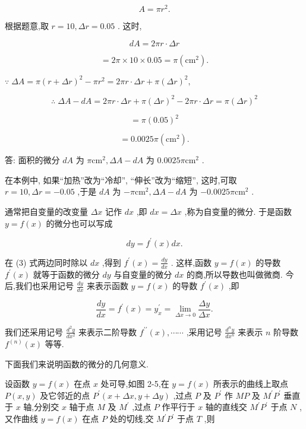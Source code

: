\documentclass[lang=cn,newtx,10pt,scheme=chinese]{elegantbook}
\begin{document}
\[
A = \pi {r}^{2}.
\]

根据题意,取 \(r = {10},{\Delta r} = {0.05}\) . 这时,

\[
{dA} = {2\pi r} \cdot {\Delta r}
\]

\[
= {2\pi } \times {10} \times {0.05} = \pi \left( {\mathrm{{cm}}}^{2}\right) \text{.}
\]

\(\because \;{\Delta A} = \pi {\left( r + \Delta r\right) }^{2} - \pi {r}^{2} = {2\pi r} \cdot {\Delta r} + \pi {\left( \Delta r\right) }^{2},\)

\[
\therefore \;{\Delta A} - {dA} = {2\pi r} \cdot {\Delta r} + \pi {\left( \Delta r\right) }^{2} - {2\pi r} \cdot {\Delta r} = \pi {\left( \Delta r\right) }^{2}
\]

\[
= \pi {\left( {0.05}\right) }^{2}
\]

\[
= {0.0025\pi }\left( {\mathrm{{cm}}}^{2}\right) \text{.}
\]

答: 面积的微分 \({dA}\) 为 \(\pi {\mathrm{{cm}}}^{2},{\Delta A} - {dA}\) 为 \({0.0025\pi }{\mathrm{{cm}}}^{2}\) .

在本例中, 如果“加热”改为“冷却”, “伸长”改为“缩短”, 这时,可取 \(r = {10},{\Delta r} = - {0.05}\) ,于是 \({dA}\) 为 \(- \pi {\mathrm{{cm}}}^{2},{\Delta A} - {dA}\) 为 \(- {0.0025\pi }{\mathrm{{cm}}}^{2}\) .

通常把自变量的改变量 \({\Delta x}\) 记作 \({dx}\) ,即 \({dx} = {\Delta x}\) ,称为自变量的微分. 于是函数 \(y = f\left( x\right)\) 的微分也可以写成

\[
{dy} = {f}^{\prime }\left( x\right) {dx}. \tag{3}
\]

在 (3) 式两边同时除以 \({dx}\) ,得到 \({f}^{\prime }\left( x\right) = \frac{dy}{dx}\) . 这样,函数 \(y = f\left( x\right)\) 的导数 \({f}^{\prime }\left( x\right)\) 就等于函数的微分 \({dy}\) 与自变量的微分 \({dx}\) 的商,所以导数也叫做微商. 今后,我们也采用记号 \(\frac{dy}{dx}\) 来表示函数 \(y = f\left( x\right)\) 的导数 \({f}^{\prime }\left( x\right)\) ,即

\[
\frac{dy}{dx} = {f}^{\prime }\left( x\right) = {y}_{x}^{\prime } = \mathop{\lim }\limits_{{{\Delta x} \rightarrow 0}}\frac{\Delta y}{\Delta x}.
\]

我们还采用记号 \(\frac{{d}^{2}y}{d{x}^{2}}\) 来表示二阶导数 \({f}^{\prime \prime }\left( x\right) ,\cdots \cdots\) ,采用记号 \(\frac{{d}^{n}y}{d{x}^{n}}\) 来表示 \(n\) 阶导数 \({f}^{\left( n\right) }\left( x\right)\) 等等.

下面我们来说明函数的微分的几何意义.

设函数 \(y = f\left( x\right)\) 在点 \(x\) 处可导,如图 2-5,在 \(y = f\left( x\right)\) 所表示的曲线上取点 \(P\left( {x,y}\right)\) 及它邻近的点 \({P}^{\prime }\left( {x + {\Delta x},y + {\Delta y}}\right)\) ,过点 \(P\) 及 \({P}^{\prime }\) 作 \({MP}\) 及 \({M}^{\prime }{P}^{\prime }\) 垂直于 \(x\) 轴,分别交 \(x\) 轴于点 \(M\) 及 \({M}^{\prime }\) ,过点 \(P\) 作平行于 \(x\) 轴的直线交 \({M}^{\prime }{P}^{\prime }\) 于点 \(N\) ,又作曲线 \(y = f\left( x\right)\) 在点 \(P\) 处的切线,交 \({M}^{\prime }{P}^{\prime }\) 于点 \(T\) ,则
\end{document}
